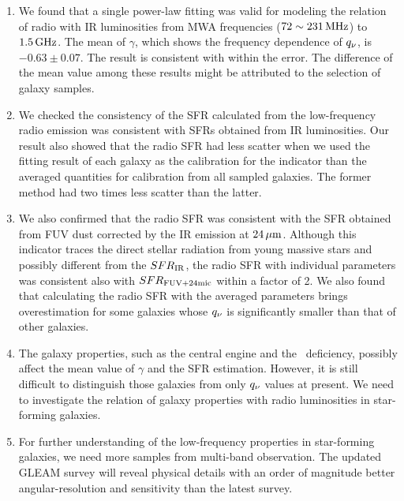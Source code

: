 \begin{enumerate}
    \item We found that a single power-law fitting was valid for modeling the relation of radio with IR luminosities from MWA frequencies ($72\sim231\,\mathrm{MHz}$) to $1.5\,\mathrm{GHz}$.
        The mean of $\gamma$, which shows the frequency dependence of $q_{\nu}$, is $-0.63\pm0.07$.
        The result is consistent with \citet{CalistroRivera2017a, Chyzy2018} within the error.
        The difference of the mean value among these results might be attributed to the selection of galaxy samples.
    \item We checked the consistency of the SFR calculated from the low-frequency radio emission was consistent with SFRs obtained from IR luminosities.
        Our result also showed that the radio SFR had less scatter when we used the fitting result of each galaxy as the calibration for the indicator than the averaged quantities for calibration from all sampled galaxies.
        The former method had two times less scatter than the latter.
    \item We also confirmed that the radio SFR was consistent with the SFR obtained from FUV dust corrected by the IR emission at $24\,\mathrm{\mu m}$.
        Although this indicator traces the direct stellar radiation from young massive stars and possibly different from the $SFR_{\mathrm{IR}}$, the radio SFR with individual parameters was consistent also with $SFR_{\mathrm{FUV+24mic}}$ within a factor of 2.
        We also found that calculating the radio SFR with the averaged parameters brings overestimation for some galaxies whose $q_{\nu}$ is significantly smaller than that of other galaxies.
    \item The galaxy properties, such as the central engine and the \nh~deficiency, possibly affect the mean value of $\gamma$ and the SFR estimation.
        However, it is still difficult to distinguish those galaxies from only $q_{\nu}$ values at present.
        We need to investigate the relation of galaxy properties with radio luminosities in star-forming galaxies.
    \item For further understanding of the low-frequency properties in star-forming galaxies, we need more samples from multi-band observation.
        The updated GLEAM survey will reveal physical details with an order of magnitude better angular-resolution and sensitivity than the latest survey.
\end{enumerate}


